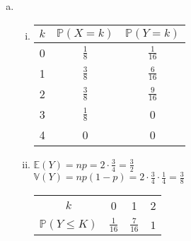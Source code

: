 \documentclass{article}
\newcommand{\E}{\mathbb{E}}
\newcommand{\V}{\mathbb{V}}
\renewcommand{\P}{\mathbb{P}}
\begin{document}
    \subsection{}
    \begin{enumerate}[a)]
        \item
            \begin{enumerate}[(i)]
           	    \item
                    \begin{tabular}{c|cc}
                        $k$&$\P(X=k)$&$\P(Y=k)$\\
                        \hline
                        0&$\frac{1}{8}$&$\frac{1}{16}$\\
                        1&$\frac{3}{8}$&$\frac{6}{16}$\\
                        2&$\frac{3}{8}$&$\frac{9}{16}$\\
                        3&$\frac{1}{8}$&0\\
                        4&0&0
                    \end{tabular}
                \item
                    $\E(Y)=np=2\cdot\frac{3}{4}=\frac{3}{2}$\\
                    $\V(Y)=np(1-p)=2\cdot\frac{3}{4}\cdot\frac{1}{4}=\frac{3}{8}$\\
                    \begin{tabular}{c|ccc}
                        $k$&0&1&2\\
                        $\P(Y\leq K)$&$\frac{1}{16}$&$\frac{7}{16}$&$1$
                    \end{tabular}

\end{enumerate}
\end{enumerate}
\end{document}
